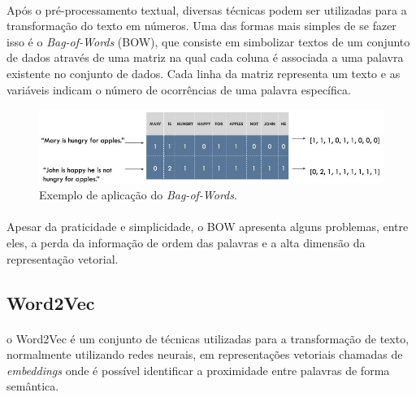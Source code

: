 \documentclass[grad,numbers]{coppe}
\begin{document}
  		\paragraph{}Após o pré-processamento textual, diversas técnicas podem ser utilizadas para a transformação do texto em números. Uma das formas mais simples de se fazer isso é o \textit{Bag-of-Words} (BOW), que consiste em simbolizar textos de um conjunto de dados através de uma matriz na qual cada coluna é associada a uma palavra existente no conjunto de dados. Cada linha da matriz representa um texto e as variáveis indicam o número de ocorrências de uma palavra específica.
  		\begin{figure}[h]
  			{\includegraphics[width=15cm]{bow-example.jpg}
 				\caption{Exemplo de aplicação do \textit{Bag-of-Words}\cite{bow-example}.}
 				\label{fig:bow-example-fig}}
  		\end{figure}
  		\paragraph{}Apesar da praticidade e simplicidade, o BOW apresenta alguns problemas, entre eles, a perda da informação de ordem das palavras e a alta dimensão da representação vetorial.
  		\subsection{Word2Vec}
  			\paragraph{}o Word2Vec é um conjunto de técnicas utilizadas para a transformação de texto, normalmente utilizando redes neurais, em representações vetoriais chamadas de \textit{embeddings} onde é possível identificar a proximidade entre palavras de forma semântica.
\end{document}
